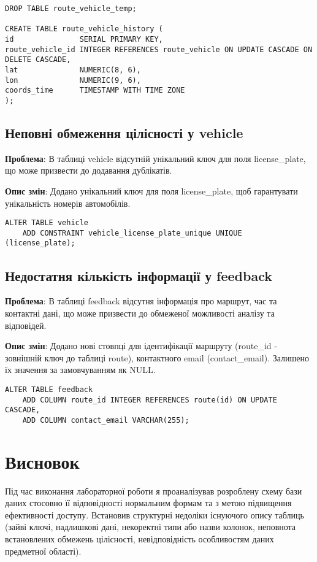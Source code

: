 \documentclass[14pt]{extreport}
\begin{document}
\begin{normalsize}
\begin{lstlisting}
DROP TABLE route_vehicle_temp;

CREATE TABLE route_vehicle_history (
id               SERIAL PRIMARY KEY,
route_vehicle_id INTEGER REFERENCES route_vehicle ON UPDATE CASCADE ON DELETE CASCADE,
lat              NUMERIC(8, 6),
lon              NUMERIC(9, 6),
coords_time      TIMESTAMP WITH TIME ZONE
);
	\end{lstlisting}
	
	\subsection*{Неповні обмеження цілісності у vehicle}
	\textbf{Проблема}: В таблиці vehicle відсутній унікальний ключ для поля license\_plate, що може призвести до додавання дублікатів.
	
	\textbf{Опис змін}: Додано унікальний ключ для поля license\_plate, щоб гарантувати унікальність номерів автомобілів.
	\begin{lstlisting}
ALTER TABLE vehicle
	ADD CONSTRAINT vehicle_license_plate_unique UNIQUE (license_plate);
	\end{lstlisting}
	
	
	\subsection*{Недостатня кількість інформації у feedback}
	\textbf{Проблема}: В таблиці feedback відсутня інформація про маршрут, час та контактні дані, що може призвести до обмеженої можливості аналізу та відповідей.
	
	\textbf{Опис змін}: Додано нові стовпці для ідентифікації маршруту (route\_id - зовнішній ключ до таблиці route), контактного email (contact\_email). Залишено їх значення за замовчуванням як NULL.
	\begin{lstlisting}
ALTER TABLE feedback
	ADD COLUMN route_id INTEGER REFERENCES route(id) ON UPDATE CASCADE, 
	ADD COLUMN contact_email VARCHAR(255);
	\end{lstlisting}
	\section*{Висновок}
	Під час виконання лабораторної роботи я проаналізував розроблену схему бази даних стосовно її відповідності нормальним формам та з метою підвищення ефективності доступу. Встановив структурні недоліки існуючого опису таблиць (зайві ключі, надлишкові дані, некоректні типи або назви колонок, неповнота встановлених обмежень цілісності, невідповідність особливостям даних предметної області).
	 
\end{normalsize}
\end{document}
